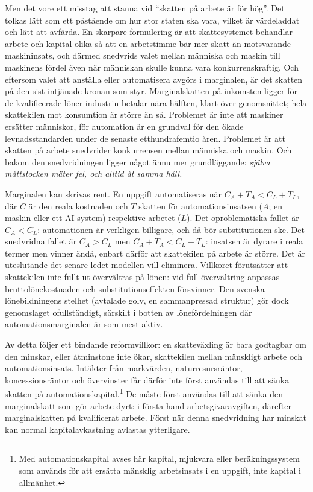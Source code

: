 \documentclass[11pt]{article}
\begin{document}
Men det vore ett misstag att stanna vid \enquote{skatten på arbete är för hög}. Det tolkas lätt som ett påstående om hur stor staten ska vara, vilket är värdeladdat och lätt att avfärda. En skarpare formulering är att skattesystemet behandlar arbete och kapital olika så att en arbetstimme bär mer skatt än motsvarande maskininsats, och därmed snedvrids valet mellan människa och maskin till maskinens fördel även när människan skulle kunna vara konkurrenskraftig. Och eftersom valet att anställa eller automatisera avgörs i marginalen, är det skatten på den sist intjänade kronan som styr. Marginalskatten på inkomsten ligger för de kvalificerade löner industrin betalar nära hälften, klart över genomsnittet; hela skattekilen mot konsumtion är större än så. Problemet är inte att maskiner ersätter människor, för automation är en grundval för den ökade levnadsstandarden under de senaste etthundrafemtio åren. Problemet är att skatten på arbete snedvrider konkurrensen mellan människa och maskin. Och bakom den snedvridningen ligger något ännu mer grundläggande: \emph{själva måttstocken mäter fel, och alltid åt samma håll.}

Marginalen kan skrivas rent. En uppgift automatiseras när $C_A + T_A < C_L + T_L$, där $C$ är den reala kostnaden och $T$ skatten för automationsinsatsen ($A$; en maskin eller ett AI-system) respektive arbetet ($L$). Det oproblematiska fallet är $C_A < C_L$: automationen är verkligen billigare, och då bör substitutionen ske. Det snedvridna fallet är $C_A > C_L$ men $C_A + T_A < C_L + T_L$: insatsen är dyrare i reala termer men vinner ändå, enbart därför att skattekilen på arbete är större. Det är uteslutande det senare ledet modellen vill eliminera. Villkoret förutsätter att skattekilen inte fullt ut övervältras på lönen: vid full övervältring anpassas bruttolönekostnaden och substitutionseffekten försvinner. Den svenska lönebildningens stelhet (avtalade golv, en sammanpressad struktur) gör dock genomslaget ofullständigt, särskilt i botten av lönefördelningen där automationsmarginalen är som mest aktiv.

Av detta följer ett bindande reformvillkor: en skatteväxling är bara godtagbar om den minskar, eller åtminstone inte ökar, skattekilen mellan mänskligt arbete och automationsinsats. Intäkter från markvärden, naturresursräntor, koncessionsräntor och övervinster får därför inte först användas till att sänka skatten på automationskapital.\footnote{Med automationskapital avses här kapital, mjukvara eller beräkningssystem som används för att ersätta mänsklig arbetsinsats i en uppgift, inte kapital i allmänhet.} De måste först användas till att sänka den marginalskatt som gör arbete dyrt: i första hand arbetsgivaravgiften, därefter marginalskatten på kvalificerat arbete. Först när denna snedvridning har minskat kan normal kapitalavkastning avlastas ytterligare.
\end{document}
